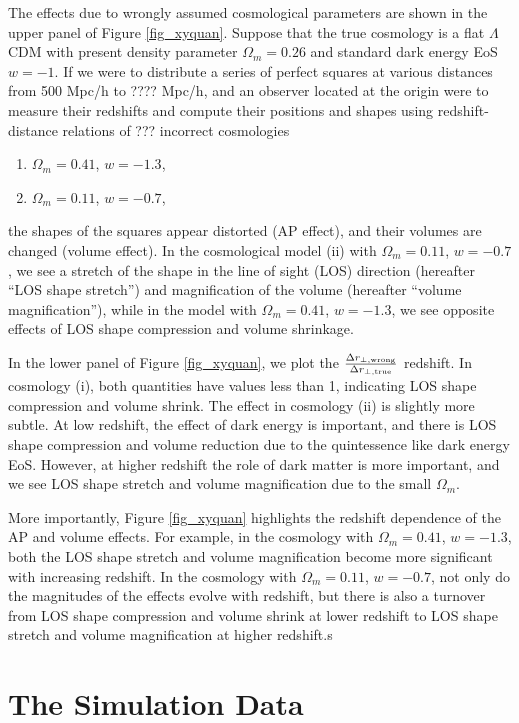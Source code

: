 \documentclass[iop]{emulateapj}
\begin{document}
The effects due to wrongly assumed cosmological parameters are shown in the upper panel of Figure \ref{fig_xyquan}.
Suppose that the true cosmology is a flat $\Lambda$CDM with present density parameter $\Omega_m=0.26$
and standard dark energy EoS $w=-1$.
If we were to distribute a series of perfect squares at various distances from 500 Mpc/h to ???? Mpc/h,
and an observer located at the origin were to measure their redshifts and compute their positions and shapes 
using redshift-distance relations of ??? incorrect cosmologies
\begin{enumerate}
 \item $\Omega_m=0.41$, $w=-1.3$,
 \item $\Omega_m=0.11$, $w=-0.7$,
\end{enumerate}
the shapes of the squares appear distorted (AP effect),
and their volumes are changed (volume effect).
In the cosmological model (ii) with $\Omega_m=0.11$, $w=-0.7$, we see a stretch of the shape in the line of sight (LOS) direction 
(hereafter ``LOS shape stretch'')
and magnification of the volume (hereafter ``volume magnification''), 
while in the model with $\Omega_m=0.41$, $w=-1.3$, we see opposite effects of LOS shape compression and volume shrinkage.

In the lower panel of Figure \ref{fig_xyquan}, we plot the $\frac{\Delta r_{\bot, \rm wrong}}{\Delta r_{\bot, \rm true}}$ redshift. 
In cosmology (i), both quantities have values less than 1, 
indicating LOS shape compression and volume shrink.
The effect in cosmology (ii) is slightly more subtle. At low redshift, the effect of dark energy is important, 
and there is LOS shape compression and volume reduction due to the quintessence like dark energy EoS.
However, at higher redshift the role of dark matter is more important, and we see LOS shape stretch and volume magnification due to the small $\Omega_m$.

More importantly, Figure \ref{fig_xyquan} highlights the redshift dependence of the AP and volume effects. 
For example, in the cosmology with $\Omega_m=0.41$, $w=-1.3$, 
both the LOS shape stretch and volume magnification become more significant with increasing redshift.
In the cosmology with $\Omega_m=0.11$, $w=-0.7$,
not only do the magnitudes of the effects evolve with redshift,
but there is also a turnover from LOS shape compression and volume shrink at lower redshift to LOS shape stretch and volume magnification at higher redshift.s

\section{The Simulation Data}\label{sec:data}
\end{document}
